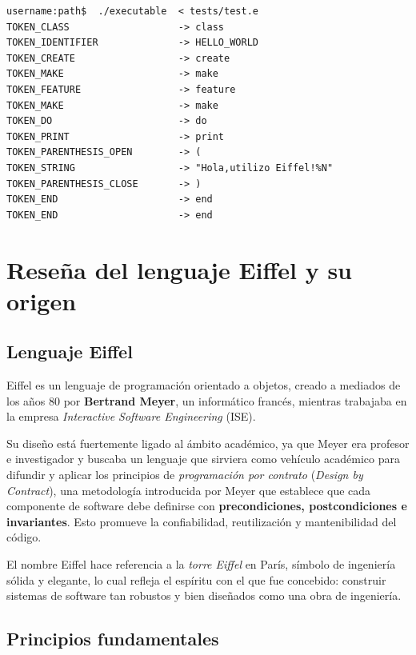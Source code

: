 \documentclass[a4paper,12pt]{article}
\begin{document}
\begin{lstlisting}[style=DOS]
username:path$  ./executable  < tests/test.e 
TOKEN_CLASS                   -> class
TOKEN_IDENTIFIER              -> HELLO_WORLD
TOKEN_CREATE                  -> create
TOKEN_MAKE                    -> make
TOKEN_FEATURE                 -> feature
TOKEN_MAKE                    -> make
TOKEN_DO                      -> do
TOKEN_PRINT                   -> print
TOKEN_PARENTHESIS_OPEN        -> (
TOKEN_STRING                  -> "Hola,utilizo Eiffel!%N"
TOKEN_PARENTHESIS_CLOSE       -> )
TOKEN_END                     -> end
TOKEN_END                     -> end
\end{lstlisting}

\newpage
\section{Reseña del lenguaje Eiffel y su origen}
\vspace{4mm}

\subsection{Lenguaje Eiffel}

Eiffel es un lenguaje de programación orientado a objetos, creado a mediados de
los años 80 por \textbf{Bertrand Meyer}, un informático francés, mientras
trabajaba en la empresa \textit{Interactive Software Engineering} (ISE).

\noindent
Su diseño está fuertemente ligado al ámbito académico, ya que Meyer era
profesor e
investigador y buscaba un lenguaje que sirviera como vehículo académico para
difundir y aplicar los principios de \textit{programación por contrato}
(\textit{Design by Contract}), una metodología introducida por Meyer que
establece que cada componente de software debe definirse con
\textbf{precondiciones, postcondiciones e invariantes}. Esto promueve la
confiabilidad, reutilización y mantenibilidad del código.

\noindent
El nombre Eiffel hace referencia a la \textit{torre Eiffel} en París, símbolo
de ingeniería sólida y elegante, lo cual refleja el espíritu con el que fue
concebido: construir sistemas de software tan robustos y bien diseñados como
una obra de ingeniería.

\subsection{Principios fundamentales}
\end{document}
